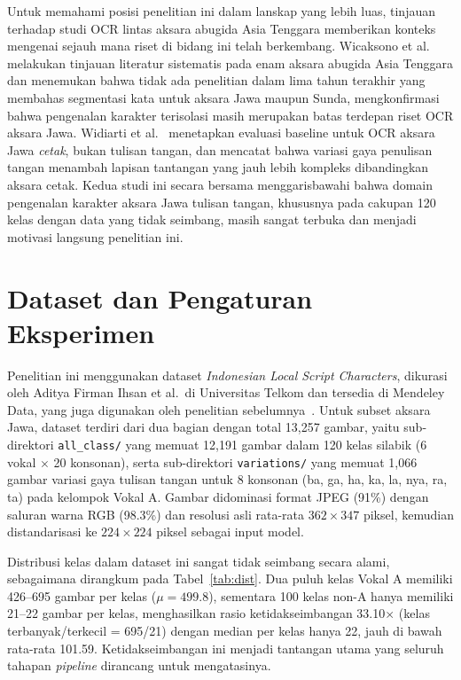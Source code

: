 \documentclass[conference]{IEEEtran}
\begin{document}
Untuk memahami posisi penelitian ini dalam lanskap yang lebih luas,
tinjauan terhadap studi OCR lintas aksara abugida Asia Tenggara
memberikan konteks mengenai sejauh mana riset di bidang ini telah
berkembang.
Wicaksono et al.~\cite{wicaksono2024} melakukan tinjauan literatur
sistematis pada enam aksara abugida Asia Tenggara dan menemukan
bahwa tidak ada penelitian dalam lima tahun terakhir yang membahas
segmentasi kata untuk aksara Jawa maupun Sunda, mengkonfirmasi
bahwa pengenalan karakter terisolasi masih merupakan batas terdepan
riset OCR aksara Jawa.
Widiarti et al.~\cite{widiarti2026} menetapkan evaluasi baseline
untuk OCR aksara Jawa \textit{cetak}, bukan tulisan tangan, dan
mencatat bahwa variasi gaya penulisan tangan menambah lapisan
tantangan yang jauh lebih kompleks dibandingkan aksara cetak.
Kedua studi ini secara bersama menggarisbawahi bahwa domain
pengenalan karakter aksara Jawa tulisan tangan, khususnya pada
cakupan 120 kelas dengan data yang tidak seimbang, masih sangat
terbuka dan menjadi motivasi langsung penelitian ini.

\section{Dataset dan Pengaturan Eksperimen}
\label{sec:dataset}

Penelitian ini menggunakan dataset \textit{Indonesian Local Script
Characters}, dikurasi oleh Aditya Firman Ihsan et al.\ di
Universitas Telkom dan tersedia di Mendeley Data, yang juga
digunakan oleh penelitian sebelumnya~\cite{wisesty2026}.
Untuk subset aksara Jawa, dataset terdiri dari dua bagian dengan
total 13,257 gambar, yaitu sub-direktori \texttt{all\_class/} yang
memuat 12,191 gambar dalam 120 kelas silabik (6 vokal $\times$
20 konsonan), serta sub-direktori \texttt{variations/} yang
memuat 1,066 gambar variasi gaya tulisan tangan untuk 8 konsonan
(ba, ga, ha, ka, la, nya, ra, ta) pada kelompok Vokal A.
Gambar didominasi format JPEG (91\%) dengan saluran warna RGB
(98.3\%) dan resolusi asli rata-rata $362\times347$ piksel,
kemudian distandarisasi ke $224\times224$ piksel sebagai input
model.

Distribusi kelas dalam dataset ini sangat tidak seimbang secara
alami, sebagaimana dirangkum pada Tabel~\ref{tab:dist}.
Dua puluh kelas Vokal A memiliki 426--695 gambar per kelas
($\mu = 499.8$), sementara 100 kelas non-A hanya memiliki
21--22 gambar per kelas, menghasilkan rasio ketidakseimbangan
33.10$\times$ (kelas terbanyak/terkecil = 695/21) dengan median
per kelas hanya 22, jauh di bawah rata-rata 101.59.
Ketidakseimbangan ini menjadi tantangan utama yang seluruh
tahapan \textit{pipeline} dirancang untuk mengatasinya.
\end{document}
